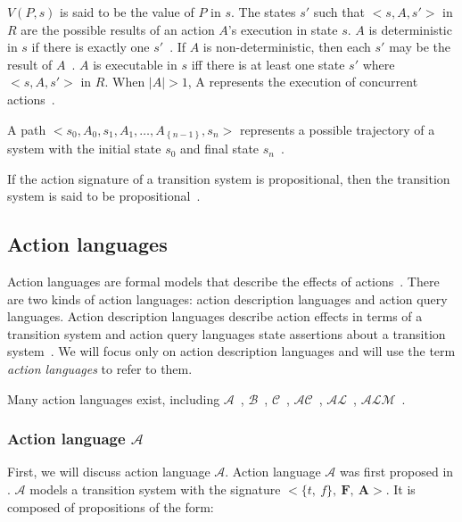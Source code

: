 $ V(P,s) $ is said to be the value of $ P $ in $ s $.
The states $ s' $ such that $ <s, A, s'> $ in $ R $ are the possible results of an action $ A $'s execution in state $ s $.
$ A $ is deterministic in $ s $ if there is exactly one $ s' $~\cite{gelfond_action_1998}.
If $ A $ is non-deterministic, then each $ s' $ may be the result of $ A $~\cite{blount_architecture_2013}.
$ A $ is executable in $ s $ iff there is at least one state $ s' $ where $ <s, A, s'> $ in $ R $.
When $ \left|A\right|>1 $, A represents the execution of concurrent actions~\cite{gelfond_action_1998, blount_architecture_2013}.

A path $ <s_0, A_0, s_1, A_1, \ldots, A_{\left\{n-1\right\}}, s_n> $ represents a possible trajectory of a system with the initial state $ s_0 $ and final state $ s_n $~\cite{blount_architecture_2013}.

If the action signature of a transition system is propositional, then the transition system is said to be propositional~\cite{gelfond_action_1998}.

\subsection{Action languages}
\label{subsec:action_languages}

Action languages are formal models that describe the effects of actions~\cite{gelfond_action_1998}.
There are two kinds of action languages: action description languages and action query languages.
Action description languages describe action effects in terms of a transition system and action query languages state assertions about a transition system~\cite{gelfond_action_1998}.
We will focus only on action description languages and will use the term \textit{action languages} to refer to them.

Many action languages exist, including $ \mathcal{A} $~\cite{gelfond_action_1998}, $ \mathcal{B} $~\cite{gelfond_action_1998}, $ \mathcal{C} $~\cite{gelfond_action_1998}, $ \mathcal{AC} $~\cite{turner_representing_1997}, $ \mathcal{AL} $~\cite{baral_reasoning_2000}, $ \mathcal{ALM} $~\cite{inclezan_modular_2016}.

\subsubsection{Action language $ \mathcal{A} $}
\label{subsubsec:action_language_a}

First, we will discuss action language $ \mathcal{A} $.
Action language $ \mathcal{A} $ was first proposed in \cite{pednault_formulating_1987}.
$ \mathcal{A} $ models a transition system with the signature $ <\{t,\ f\},\ \boldsymbol{F},\ \boldsymbol{A}> $.
It is composed of propositions of the form:


